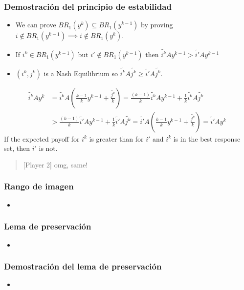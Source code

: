 \documentclass[handout, pdf]{beamer}
\newcommand{\pstrat}{\widetilde}
\begin{document}
\begin{frame}
    \frametitle{Demostración del principio de estabilidad}
    \begin{itemize}
        \item We can prove $BR_1(y^{k}) \subseteq BR_1(y^{k-1})$ by proving $i \notin BR_1(y^{k-1}) \implies i \notin BR_1(y^{k})$.
        \item \pause If $i^k \in BR_1(y^{k-1})$ but $i' \notin BR_1(y^{k-1})$ then $\pstrat{i^k}Ay^{k-1} > \pstrat{i'}Ay^{k-1}$
        \item \pause $(i^k, j^k)$ is a Nash Equilibrium so $\pstrat{i^k}A\pstrat{j^k} \ge \pstrat{i'}A\pstrat{j^k}$.
    \end{itemize}
    \pause
    \begin{align*}
        \pstrat{i^k}Ay^k &= \pstrat{i^k}A(\frac{k - 1}{k} y^{k-1} + \frac{\pstrat{j^k}}{k}) = \frac{(k - 1)}{k} \pstrat{i^k}Ay^{k-1} + \frac{1}{k}\pstrat{i^k}A\pstrat{j^k}\\
        &> \frac{(k - 1)}{k} \pstrat{i'}Ay^{k-1} + \frac{1}{k}\pstrat{i'}A\pstrat{j^k} = \pstrat{i'}A(\frac{k - 1}{k} y^{k-1} + \frac{\pstrat{j^k}}{k}) = \pstrat{i'}Ay^k
    \end{align*}
    \pause If the expected payoff for $i^k$ is greater than for $i'$ and $i^k$ is in the best response set, then $i'$ is not.
    
    \begin{quote}[Player 2]
        omg, same!
    \end{quote}
\end{frame}

\begin{frame}
    \frametitle{Rango de imagen}
        \begin{itemize}
        \item 
        \end{itemize}
\end{frame}

\begin{frame}
    \frametitle{Lema de preservación}
        \begin{itemize}
        \item 
        \end{itemize}
\end{frame}

\begin{frame}
    \frametitle{Demostración del lema de preservación}
        \begin{itemize}
        \item 
        \end{itemize}
\end{frame}
\end{document}
